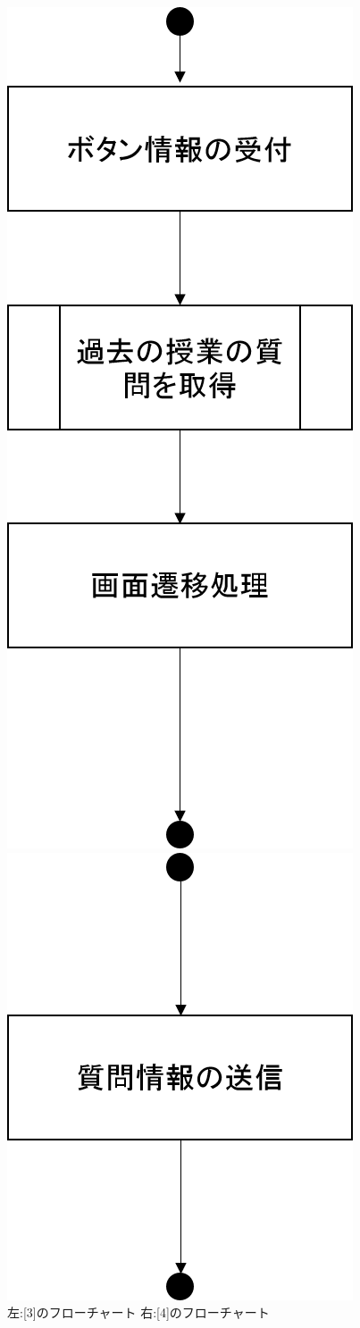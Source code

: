 \begin{figure}[htbp]
 \begin{minipage}{0.5\hsize}
  \begin{center}
   \includegraphics[width=0.45\linewidth,clip]{./img/q_read_old/sub3.png}
  \end{center}
 \end{minipage}
 \begin{minipage}{0.5\hsize}
  \begin{center}
   \includegraphics[width=0.45\linewidth,clip]{./img/q_read_old/sub4.png}
  \end{center}
 \end{minipage}
 \caption{左:[3]のフローチャート 右:[4]のフローチャート}\label{fig:qreadoldflow0}
\end{figure}


